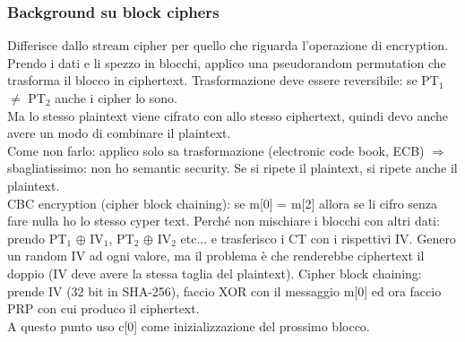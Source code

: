 \documentclass[16px]{article}
\begin{document}
\subsubsection{Background su block ciphers}
Differisce dallo stream cipher per quello che riguarda l'operazione di encryption.\\ Prendo i dati e li spezzo in blocchi, applico una pseudorandom permutation che trasforma il blocco in ciphertext. Trasformazione deve essere reversibile: se PT$_{1}$ $\neq$ PT$_{2}$ anche i cipher lo sono.\\ Ma lo stesso plaintext viene cifrato con allo stesso ciphertext, quindi devo anche avere un modo di combinare il plaintext.\\ Come non farlo: applico solo sa trasformazione (electronic code book, ECB) $\Rightarrow$ sbagliatissimo: non ho semantic security. Se si ripete il plaintext, si ripete anche il plaintext.\\ CBC encryption (cipher block chaining): se m[0] = m[2] allora se li cifro senza fare nulla ho lo stesso cyper text. Perché non mischiare i blocchi con altri dati: \\ prendo PT$_{1}$ $\oplus$ IV$_{1}$, PT$_{2}$ $\oplus$ IV$_{2}$ etc...  e trasferisco i CT con i rispettivi IV. Genero un random IV ad ogni valore, ma il problema è che renderebbe ciphertext il doppio (IV deve avere la stessa taglia del plaintext). Cipher block chaining: prende IV (32 bit in SHA-256), faccio XOR con il messaggio m[0] ed ora faccio PRP con cui produco il ciphertext.\\ A questo punto uso c[0] come inizializzazione del prossimo blocco.
\end{document}
